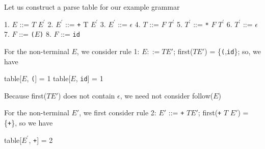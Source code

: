 \documentclass[8pt,a4paper,compress,handout]{beamer}
\newcommand{\mm}[1]{$#1$}
\newcommand{\expo}[2]{$#1^{#2}$}
\newenvironment{spaced}
{
\smallskip
\hspace{.5cm}
\begin{minipage}[c]{\textwidth}
}
{
\end{minipage}
\smallskip
}
\begin{document}
\begin{frame}[fragile]
\pause

Let us construct a parse table for our example grammar

\text{ }
\begin{spaced}
\begin{production}
1. \mm{E}  ::= \mm{T} \expo{E}{\prime}
2. \expo{E}{\prime} ::= \lstinline{+} T \expo{E}{\prime}
3. \expo{E}{\prime} ::= \mm{\epsilon}
4. \mm{T}  ::= \mm{F} \expo{T}{\prime}
5. \expo{T}{\prime} ::= \lstinline{*} \mm{F} \expo{T}{\prime}
6. \expo{T}{\prime} ::= \mm{\epsilon}
7. \mm{F}  ::= \lstinline{(}\mm{E}\lstinline{)}
8. \mm{F}  ::= \lstinline{id}
\end{production}
\end{spaced}

\pause

For the non-terminal $E$, we consider rule 1: $E  ::= T E'$;  first($T E'$) = \{\lstinline{(},\lstinline{id}\}; so, we have

\text{ }
\begin{spaced}
\begin{production}
table[\mm{E}, \lstinline{(}] = 1
table[\mm{E}, \lstinline{id}] = 1
\end{production}
\end{spaced}

\pause

Because first($T E'$) does not contain $\epsilon$, we need not consider follow($E$)

\pause
\bigskip

For the non-terminal $E'$, we first consider rule 2: $E'$ ::= \lstinline{+} $T E'$; first(\lstinline{+} $T$ $E'$) = \{\lstinline{+}\}, so we have

\text{ }
\begin{spaced}
\begin{production}
table[\expo{E}{\prime}, \lstinline{+}] = 2
\end{production}
\end{spaced}
\end{frame}
\end{document}
